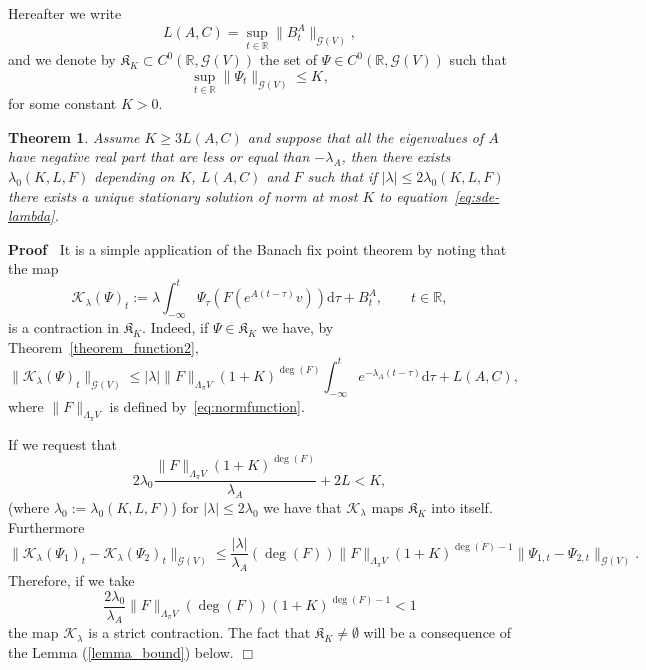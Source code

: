 \documentclass{article}
\newcommand{\assign}{:=}
\newcommand{\mathd}{\mathrm{d}}
\newenvironment{proof}{\noindent\textbf{Proof\ }}{\hspace*{\fill}$\Box$\medskip}
\newtheorem{theorem}{Theorem}
\begin{document}
Hereafter we write
\[ L (A, C) = \sup_{t \in \mathbb{R}} \| B^A_t \|_{\mathcal{G} (V)}, \]
and we denote by $\mathfrak{K}_K \subset C^0 (\mathbb{R}, \mathcal{G} (V))$
the set of $\Psi \in C^0 (\mathbb{R}, \mathcal{G} (V))$ such that
\[ \sup_{t \in \mathbb{R}} \| \Psi_t \|_{\mathcal{G} (V)} \leqslant K_{}, \]
for some constant $K > 0$.

\begin{theorem}
  \label{theorem_stationary}Assume $K \geqslant 3 L (A, C)$ and suppose that
  all the eigenvalues of $A$ have negative real part that are less or equal
  than $- \lambda_A$, then there exists $\lambda_0 (K, L, F)$ depending on
  $K$, $L (A, C)$ and $F$ such that if $| \lambda | \leqslant 2 \lambda_0 (K,
  L, F)$ there exists a unique stationary solution of norm at most $K$ to
  equation~{\eqref{eq:sde-lambda}}.
\end{theorem}

\begin{proof}
  It is a simple application of the Banach fix point theorem by noting that
  the map
  \[ \mathcal{K}_{\lambda} (\Psi)_t \assign \lambda \int_{- \infty}^t
     \Psi_{\tau} (F (e^{A (t - \tau)} v)) \mathd \tau + B^A_t, \qquad t \in
     \mathbb{R}, \]
  is a contraction in $\mathfrak{K}_K$. Indeed, if $\Psi \in \mathfrak{K}_K$
  we have, by Theorem~\ref{theorem_function2},
  \[ \| \mathcal{K}_{\lambda} (\Psi)_t \|_{\mathcal{G} (V)} \leqslant |
     \lambda |  \| F \|_{\Lambda_{\pi} V} (1 + K)^{\deg (F)} \int_{- \infty}^t
     e^{- \lambda_A (t - \tau)} \mathd \tau + L (A, C), \]
  where $\| F \|_{\Lambda_{\pi} V}$ is defined by~{\eqref{eq:normfunction}}.
  
  If we request that
  \begin{equation}
    2 \lambda_0 \frac{\| F \|_{\Lambda_{\pi} V} (1 + K)^{\deg (F)}}{\lambda_A}
    + 2 L < K, \label{eq:contraction2}
  \end{equation}
  (where $\lambda_0 \assign \lambda_0 (K, L, F)$) for $| \lambda | \leqslant 2
  \lambda_0$ we have that $\mathcal{K}_{\lambda}$ maps $\mathfrak{K}_K$ into
  itself. Furthermore
  \[ \| \mathcal{K}_{\lambda} (\Psi_1)_t - \mathcal{K}_{\lambda} (\Psi_2)_t
     \|_{\mathcal{G} (V)} \leqslant \frac{| \lambda |}{\lambda_A} (\deg (F))
     \| F \|_{\Lambda_{\pi} V} (1 + K)^{\deg (F) - 1} \| \Psi_{1, t} -
     \Psi_{2, t} \|_{\mathcal{G} (V)} . \]
  Therefore, if we take
  \begin{equation}
    \frac{2 \lambda_0}{\lambda_A} \| F \|_{\Lambda_{\pi} V} (\deg (F)) (1 +
    K)^{\deg (F) - 1} < 1 \label{eq:contraction}
  \end{equation}
  the map $\mathcal{K}_{\lambda}$ is a strict contraction. The fact that
  $\mathfrak{K}_K \neq \emptyset$ will be a consequence of the Lemma
  (\ref{lemma_bound}) below.
\end{proof}
\end{document}
